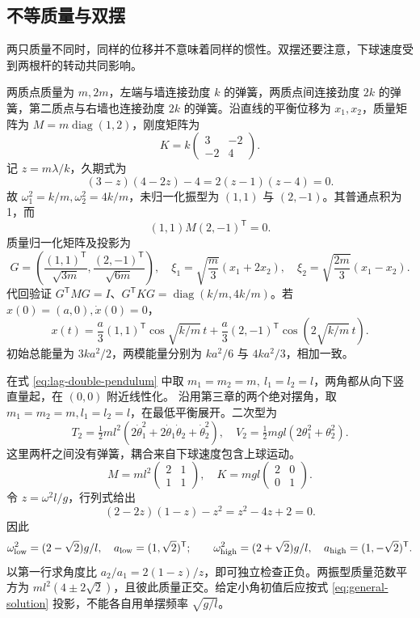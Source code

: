 \subsection{不等质量与双摆}
两只质量不同时，同样的位移并不意味着同样的惯性。双摆还要注意，下球速度受到两根杆的转动共同影响。

\begin{example}
两质点质量为 $m,2m$，左端与墙连接劲度 $k$ 的弹簧，两质点间连接劲度 $2k$ 的弹簧，第二质点与右墙也连接劲度 $2k$ 的弹簧。沿直线的平衡位移为 $x_1,x_2$，质量矩阵为 $M=m\operatorname{diag}(1,2)$，刚度矩阵为
\[
K=k\begin{pmatrix}3&-2\\-2&4\end{pmatrix}.
\]
记 $z=m\lambda/k$，久期式为
\[
(3-z)(4-2z)-4=2(z-1)(z-4)=0.
\]
故 $\omega_1^2=k/m,\omega_2^2=4k/m$，未归一化振型为 $(1,1)$ 与 $(2,-1)$。其普通点积为1，而
\[
(1,1)M(2,-1)^{\mathsf T}=0.
\]
质量归一化矩阵及投影为
\begin{equation}
G=\left(\frac{(1,1)^{\mathsf T}}{\sqrt{3m}},
\frac{(2,-1)^{\mathsf T}}{\sqrt{6m}}\right),\quad
\xi_1=\sqrt{\frac m3}(x_1+2x_2),\quad
\xi_2=\sqrt{\frac{2m}3}(x_1-x_2).
\label{eq:osc-unequal-G}
\end{equation}
代回验证 $G^{\mathsf T}MG=I$、$G^{\mathsf T}KG=\operatorname{diag}(k/m,4k/m)$。若 $x(0)=(a,0),\dot x(0)=0$，
\[
x(t)=\frac a3(1,1)^{\mathsf T}\cos\sqrt{k/m}\,t
+\frac a3(2,-1)^{\mathsf T}\cos(2\sqrt{k/m}\,t).
\]
初始总能量为 $3ka^2/2$，两模能量分别为 $ka^2/6$ 与 $4ka^2/3$，相加一致。
\end{example}

\begin{example}
在式 \eqref{eq:lag-double-pendulum} 中取 $m_1=m_2=m,\ l_1=l_2=l$，两角都从向下竖直量起，在 $(0,0)$ 附近线性化。
沿用第三章的两个绝对摆角，取 $m_1=m_2=m,l_1=l_2=l$，在最低平衡展开。二次型为
\[
T_2=\tfrac12ml^2(2\dot\theta_1^2+2\dot\theta_1\dot\theta_2+\dot\theta_2^2),\quad
V_2=\tfrac12mgl(2\theta_1^2+\theta_2^2).
\]
这里两杆之间没有弹簧，耦合来自下球速度包含上球运动。
\[
M=ml^2\begin{pmatrix}2&1\\1&1\end{pmatrix},\quad
K=mgl\begin{pmatrix}2&0\\0&1\end{pmatrix}.
\]
令 $z=\omega^2l/g$，行列式给出
\[
(2-2z)(1-z)-z^2=z^2-4z+2=0.
\]
因此
\begin{equation}
\omega_{\rm low}^2=(2-\sqrt2)g/l,\quad a_{\rm low}=(1,\sqrt2)^{\mathsf T};\qquad
\omega_{\rm high}^2=(2+\sqrt2)g/l,\quad a_{\rm high}=(1,-\sqrt2)^{\mathsf T}.
\label{eq:osc-double-pend}
\end{equation}
以第一行求角度比 $a_2/a_1=2(1-z)/z$，即可独立检查正负。两振型质量范数平方为 $ml^2(4\pm2\sqrt2)$，且彼此质量正交。给定小角初值后应按式 \eqref{eq:general-solution} 投影，不能各自用单摆频率 $\sqrt{g/l}$。
\end{example}

